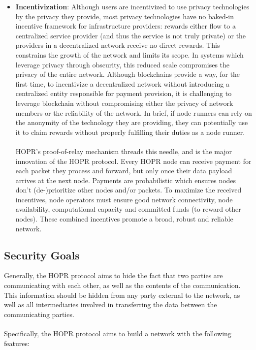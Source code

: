\begin{itemize}
    \item \textbf{Incentivization}: Although users are incentivized to use privacy technologies by the privacy they provide, most privacy technologies have no baked-in incentive framework for infrastructure providers: rewards either flow to a centralized service provider (and thus the service is not truly private) or the providers in a decentralized network receive no direct rewards. This constrains the growth of the network and limits its scope. In systems which leverage privacy through obscurity, this reduced scale compromises the privacy of the entire network. Although blockchains provide a way, for the first time, to incentivize a decentralized network without introducing a centralized entity responsible for payment provision, it is challenging to leverage blockchain without compromising either the privacy of network members or the reliability of the network. In brief, if node runners can rely on the anonymity of the technology they are providing, they can potentially use it to claim rewards without properly fulfilling their duties as a node runner.  
    \\~\\HOPR's proof-of-relay mechanism threads this needle, and is the major innovation of the HOPR protocol. Every HOPR node can receive payment for each packet they process and forward, but only once their data payload arrives at the next node. Payments are probabilistic which ensures nodes don't
        (de-)prioritize other nodes and/or packets. To maximize the received
        incentives, node operators must ensure good network connectivity,
        node availability, computational capacity and
        committed funds (to reward other nodes). These combined incentives promote a broad, robust and reliable network.

\end{itemize}

\subsection{Security Goals}
\label{sec:securitygoals}

Generally, the HOPR protocol aims to hide the fact that two parties are communicating with each other, as well as the contents of the communication. This information should be hidden from any party external to the network, as well as all intermediaries involved in transferring the data between the communicating parties.
\\~\\Specifically, the HOPR protocol aims to build a network with the following features:

